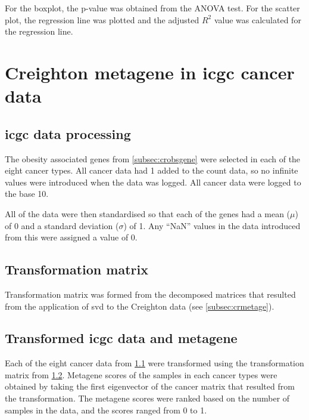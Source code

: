 For the boxplot, the p-value was obtained from the ANOVA test.
For the scatter plot, the regression line was plotted and the adjusted $R^2$ value was calculated for the regression line.


\section{Creighton metagene in \gls{icgc} cancer data}
\label{sec:crmetaicgc}

\subsection{\gls{icgc} data processing}
\label{subsec:datprocicgc}

The obesity associated genes from \cref{subsec:crobsgene} were selected in each of the eight cancer types.
All cancer data had 1 added to the count data, so no infinite values were introduced when the data was logged.
All cancer data were logged to the base 10.

All of the data were then standardised so that each of the genes had a mean ($\mu$) of 0 and a standard deviation ($\sigma$) of 1.
Any ``NaN'' values in the data introduced from this were assigned a value of 0.

\subsection{Transformation matrix}
\label{subsec:transmatcr}

Transformation matrix was formed from the decomposed matrices that resulted from the application of \gls{svd} to the Creighton data (see \cref{subsec:crmetage}).

\subsection{Transformed \gls{icgc} data and metagene}
\label{subsec:icgctranscr}

Each of the eight cancer data from \cref{subsec:datprocicgc} were transformed using the transformation matrix from \cref{subsec:transmatcr}.
Metagene scores of the samples in each cancer types were obtained by taking the first eigenvector of the cancer matrix that resulted from the transformation.
The \gls{metagene} scores were ranked based on the number of samples in the data, and the scores ranged from 0 to 1.

